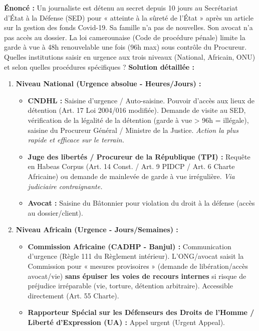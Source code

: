 \documentclass[11pt]{article}
\newcommand{\cle}[1]{{\popxbold\color{popdark}#1}}
\begin{document}
\begin{exoresolu}
    \textbf{Énoncé :} Un journaliste est détenu au secret depuis 10 jours au Secrétariat d'État à la Défense (SED) pour « atteinte à la sûreté de l'État » après un article sur la gestion des fonds Covid-19. Sa famille n'a pas de nouvelles. Son avocat n'a pas accès au dossier. La loi camerounaise (Code de procédure pénale) limite la garde à vue à 48h renouvelable une fois (96h max) sous contrôle du Procureur. Quelles institutions saisir en urgence aux trois niveaux (National, Africain, ONU) et selon quelles procédures spécifiques ?
    \tcblower
    \textbf{Solution détaillée :}
    \begin{enumerate}
        \item \textbf{Niveau National (Urgence absolue - Heures/Jours) :}
            \begin{itemize}
                \item \textbf{CNDHL :} \cle{Saisine d'urgence / Auto-saisine.} Pouvoir d'accès aux lieux de détention (Art. 17 Loi 2004/016 modifiée). Demande de visite au SED, vérification de la légalité de la détention (garde à vue > 96h = illégale), saisine du Procureur Général / Ministre de la Justice. \emph{Action la plus rapide et efficace sur le terrain.}
                \item \textbf{Juge des libertés / Procureur de la République (TPI) :} Requête en \cle{Habeas Corpus} (Art. 14 Const. / Art. 9 PIDCP / Art. 6 Charte Africaine) ou demande de mainlevée de garde à vue irrégulière. \emph{Via judiciaire contraignante.}
                \item \textbf{Avocat :} Saisine du Bâtonnier pour violation du droit à la défense (accès au dossier/client).
            \end{itemize}
        \item \textbf{Niveau Africain (Urgence - Jours/Semaines) :}
            \begin{itemize}
                \item \textbf{Commission Africaine (CADHP - Banjul) :} \cle{Communication d'urgence (Règle 111 du Règlement intérieur).} L'ONG/avocat saisit la Commission pour « mesures provisoires » (demande de libération/accès avocat/vie) \textbf{sans épuiser les voies de recours internes} si risque de préjudice irréparable (vie, torture, détention arbitraire). Accessible directement (Art. 55 Charte).
                \item \textbf{Rapporteur Spécial sur les Défenseurs des Droits de l'Homme / Liberté d'Expression (UA) :} Appel urgent (Urgent Appeal).

\end{itemize}
\end{enumerate}
\end{exoresolu}
\end{document}
